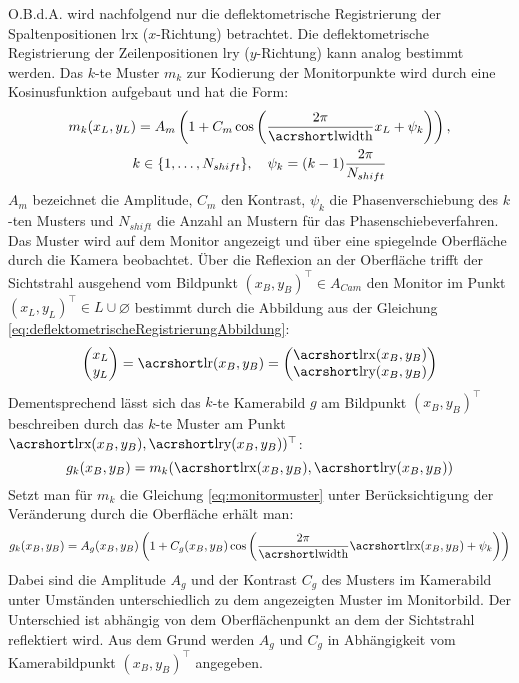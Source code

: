 \p
O.B.d.A. wird nachfolgend nur die deflektometrische Registrierung der Spaltenpositionen \acrshort{lrx} ($x$-Richtung) betrachtet.
Die deflektometrische Registrierung der Zeilenpositionen \acrshort{lry} ($y$-Richtung) kann analog bestimmt werden.
Das $k$-te Muster $m_k$ zur Kodierung der Monitorpunkte wird durch eine Kosinusfunktion aufgebaut und hat die Form:
%
\begin{equation}\label{eq:monitormuster}
	\begin{gathered}	
		m_k(x_L,y_L) = A_m \left(1 + C_m \cos \left(\dfrac{2\pi}{\acrshortmath{lwidth}} x_L + \psi_k\right)\right),\\
		k \in \lbrace 1,\ldots,N_{shift}\rbrace,
		\quad
		\psi_k = (k - 1)\dfrac{2\pi}{N_{shift}}
	\end{gathered}
\end{equation}
%
$A_m$ bezeichnet die Amplitude, $C_m$ den Kontrast, $\psi_k$ die Phasenverschiebung des $k$-ten Musters und $N_{shift}$ die Anzahl an Mustern für das Phasenschiebeverfahren.
Das Muster wird auf dem Monitor angezeigt und über eine spiegelnde Oberfläche durch die Kamera beobachtet.
Über die Reflexion an der Oberfläche trifft der Sichtstrahl ausgehend vom Bildpunkt $(x_B, y_B)^\top \in A_{Cam}$ den Monitor im Punkt $(x_L, y_L)^\top \in L \cup \varnothing$ bestimmt durch die Abbildung aus der Gleichung \ref{eq:deflektometrischeRegistrierungAbbildung}:
%
\begin{equation}
	\begin{pmatrix}
		x_L \\ 
		y_L
	\end{pmatrix}
	= \acrshortmath{lr}(x_B, y_B) = 
	\begin{pmatrix}
		\acrshortmath{lrx}(x_B, y_B) \\ 
		\acrshortmath{lry}(x_B, y_B)
	\end{pmatrix} 
\end{equation}
%
Dementsprechend lässt sich das $k$-te Kamerabild $g$ am Bildpunkt $(x_B, y_B)^\top$ beschreiben durch das $k$-te Muster am Punkt $\acrshortmath{lrx}(x_B, y_B), \acrshortmath{lry}(x_B, y_B))^\top$:
%
\begin{equation}
	g_k(x_B, y_B) = m_k(\acrshortmath{lrx}(x_B, y_B), \acrshortmath{lry}(x_B, y_B))
\end{equation}
%
Setzt man für $m_k$ die Gleichung \ref{eq:monitormuster} unter Berücksichtigung der Veränderung durch die Oberfläche erhält man:
%
\begin{equation}\label{eq:kamerabild}
	g_k(x_B, y_B) = A_g(x_B, y_B) \left(1 + C_g(x_B, y_B) \cos \left(\dfrac{2\pi}{\acrshortmath{lwidth}}\acrshortmath{lrx}(x_B, y_B) + \psi_k\right)\right)
\end{equation}
%
Dabei sind die Amplitude $A_g$ und der Kontrast $C_g$ des Musters im Kamerabild unter Umständen unterschiedlich zu dem angezeigten Muster im Monitorbild.
Der Unterschied ist abhängig von dem Oberflächenpunkt an dem der Sichtstrahl reflektiert wird.
Aus dem Grund werden $A_g$ und $C_g$ in Abhängigkeit vom Kamerabildpunkt $(x_B, y_B)^\top$ angegeben.

